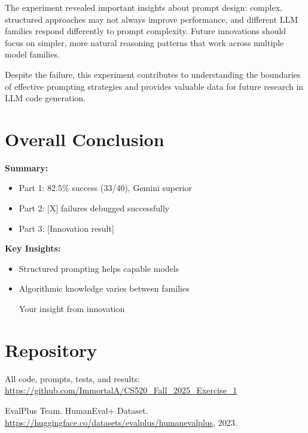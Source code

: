 \documentclass[11pt]{article}
\begin{document}
The experiment revealed important insights about prompt design: complex, structured approaches may not always improve performance, and different LLM families respond differently to prompt complexity. Future innovations should focus on simpler, more natural reasoning patterns that work across multiple model families.

Despite the failure, this experiment contributes to understanding the boundaries of effective prompting strategies and provides valuable data for future research in LLM code generation.

\section{Overall Conclusion}

\textbf{Summary:}
\begin{itemize}
    \item Part 1: 82.5\% success (33/40), Gemini superior
    \item Part 2: [X] failures debugged successfully
    \item Part 3: [Innovation result]
\end{itemize}

\textbf{Key Insights:}
\begin{itemize}
    \item Structured prompting helps capable models
    \item Algorithmic knowledge varies between families
    \item [Your insight from innovation]
\end{itemize}

\section{Repository}

All code, prompts, tests, and results:\\
\url{https://github.com/ImmortalA/CS520_Fall_2025_Exercise_1}

\begin{thebibliography}{9}
EvalPlus Team. HumanEval+ Dataset. 
\url{https://huggingface.co/datasets/evalplus/humanevalplus}, 2023.
\end{thebibliography}
\end{document}
